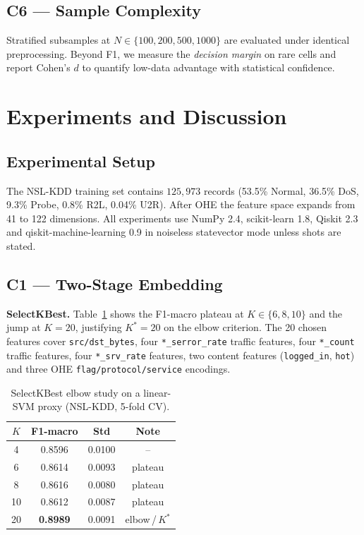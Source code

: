 \documentclass[journal]{IEEEtran}
\begin{document}
  \subsection{C6 --- Sample Complexity}
  Stratified subsamples at $N\in\{100,200,500,1000\}$ are evaluated
  under identical preprocessing. Beyond F1, we measure the
  \emph{decision margin} on rare cells and report Cohen's $d$ to
  quantify low-data advantage with statistical confidence.

  \section{Experiments and Discussion}\label{sec:exp}

  \subsection{Experimental Setup}
  The NSL-KDD training set contains $125{,}973$ records (53.5\% Normal,
  36.5\% DoS, 9.3\% Probe, 0.8\% R2L, 0.04\% U2R). After OHE the
  feature space expands from 41 to 122 dimensions. All experiments use
  NumPy 2.4, scikit-learn 1.8, Qiskit 2.3 and
  qiskit-machine-learning 0.9 in noiseless statevector mode unless
  shots are stated.

  \subsection{C1 --- Two-Stage Embedding}
  \textbf{SelectKBest.} Table~\ref{tab:c1-kbest} shows the F1-macro
  plateau at $K{\in}\{6,8,10\}$ and the jump at $K{=}20$, justifying
  $K^{*}{=}20$ on the elbow criterion. The 20 chosen features cover
  \texttt{src/dst\_bytes}, four \texttt{*\_serror\_rate} traffic
  features, four \texttt{*\_count} traffic features, four
  \texttt{*\_srv\_rate} features, two content features
  (\texttt{logged\_in}, \texttt{hot}) and three OHE
  \texttt{flag/protocol/service} encodings.

  \begin{table}[t]
  \centering
  \caption{SelectKBest elbow study on a linear-SVM proxy
    (NSL-KDD, 5-fold CV).}
  \label{tab:c1-kbest}
  \small
  \begin{tabular}{cccc}
  \toprule
  $K$ & F1-macro & Std & Note\\\midrule
  4  & 0.8596 & 0.0100 & --\\
  6  & 0.8614 & 0.0093 & plateau\\
  8  & 0.8616 & 0.0080 & plateau\\
  10 & 0.8612 & 0.0087 & plateau\\
  20 & \textbf{0.8989} & 0.0091 & elbow\,/\,$K^{*}$\\
  \bottomrule
  \end{tabular}
  \end{table}
\end{document}
